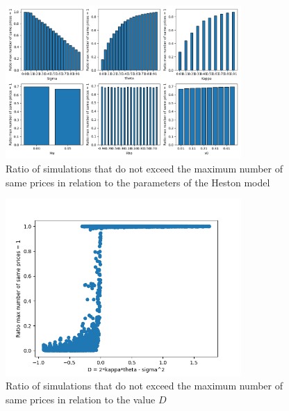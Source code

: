 \begin{figure}
    \centering
    \includegraphics[width=0.8\textwidth]{img/max_number_of_same_prices_ratio_parameters.png}
    \caption{Ratio of simulations that do not exceed the maximum number of same prices in relation to the parameters of the Heston model}
    \label{fig:max_number_of_same_prices_ratio_parameters}
\end{figure}

\begin{figure}
    \centering
    \includegraphics[width=0.8\textwidth]{img/max_number_of_same_prices_ratio_feller_diff.png}
    \caption{Ratio of simulations that do not exceed the maximum number of same prices in relation to the value $D$}
    \label{fig:max_number_of_same_prices_ratio_D}
\end{figure}

